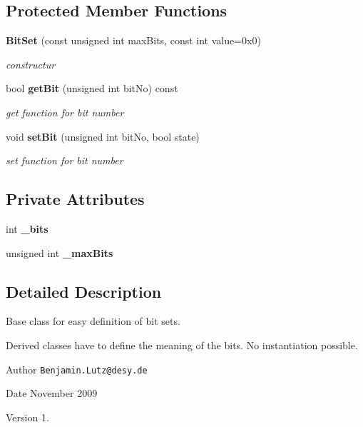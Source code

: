 \subsection*{Protected Member Functions}
\begin{DoxyCompactItemize}
\item 
{\bf Bit\-Set} (const unsigned int max\-Bits, const int value=0x0)
\begin{DoxyCompactList}\small\item\em constructur \end{DoxyCompactList}\item 
bool {\bf get\-Bit} (unsigned int bit\-No) const 
\begin{DoxyCompactList}\small\item\em get function for bit number \end{DoxyCompactList}\item 
void {\bf set\-Bit} (unsigned int bit\-No, bool state)
\begin{DoxyCompactList}\small\item\em set function for bit number \end{DoxyCompactList}\end{DoxyCompactItemize}
\subsection*{Private Attributes}
\begin{DoxyCompactItemize}
\item 
int {\bfseries \-\_\-bits}\label{classCALICE_1_1BitSet_acb489ad5309a1343dc9d368fbfabb4e7}

\item 
unsigned int {\bfseries \-\_\-max\-Bits}\label{classCALICE_1_1BitSet_a0105ecaa0c1f03c666f90f3d3b7207c6}

\end{DoxyCompactItemize}


\subsection{Detailed Description}
Base class for easy definition of bit sets. 

Derived classes have to define the meaning of the bits. No instantiation possible.

\begin{DoxyAuthor}{Author}
{\tt Benjamin.\-Lutz@desy.\-de} 
\end{DoxyAuthor}
\begin{DoxyDate}{Date}
November 2009 
\end{DoxyDate}
\begin{DoxyVersion}{Version}
1. 
\end{DoxyVersion}


